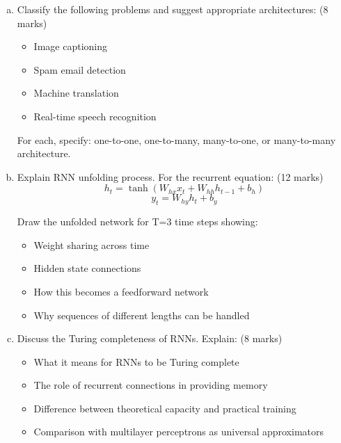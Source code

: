 \documentclass[12pt]{article}
\newcommand{\mediumanswer}{\vspace{3cm}}
\newcommand{\journalspace}{\vspace{4.5cm}}
\begin{document}
\begin{enumerate}[(a)]
    \item Classify the following problems and suggest appropriate architectures: \hfill (8 marks)
    \begin{itemize}
        \item Image captioning
        \item Spam email detection
        \item Machine translation
        \item Real-time speech recognition
    \end{itemize}
    
    For each, specify: one-to-one, one-to-many, many-to-one, or many-to-many architecture.
    
    \mediumanswer
    
    \item Explain RNN unfolding process. For the recurrent equation: \hfill (12 marks)
    $$h_t = \tanh(W_{hx} x_t + W_{hh} h_{t-1} + b_h)$$
    $$y_t = W_{hy} h_t + b_y$$
    
    Draw the unfolded network for T=3 time steps showing:
    \begin{itemize}
        \item Weight sharing across time
        \item Hidden state connections
        \item How this becomes a feedforward network
        \item Why sequences of different lengths can be handled
    \end{itemize}
    
    \journalspace
    
    \item Discuss the Turing completeness of RNNs. Explain: \hfill (8 marks)
    \begin{itemize}
        \item What it means for RNNs to be Turing complete
        \item The role of recurrent connections in providing memory
        \item Difference between theoretical capacity and practical training
        \item Comparison with multilayer perceptrons as universal approximators
    \end{itemize}
    
    \mediumanswer
\end{enumerate}
\end{document}
